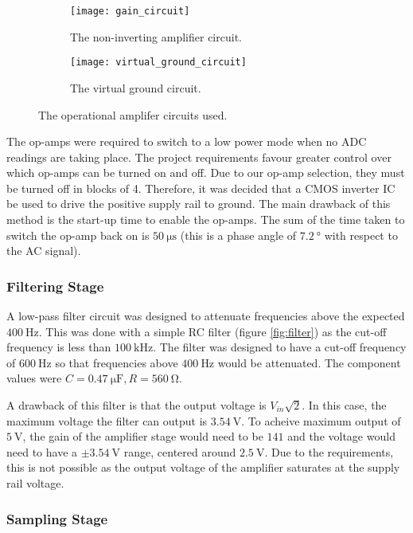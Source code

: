 \begin{figure}[ht]
\centering

\begin{subfigure}[c]{0.45\textwidth}
	\centering
	\texttt{[image: gain\_circuit]}
	\caption{The non-inverting amplifier circuit.}
	\label{fig:non-inverting-op-amp}
\end{subfigure}
\hfill
\begin{subfigure}[c]{0.45\textwidth}
	\centering
	\vfill
	\texttt{[image: virtual\_ground\_circuit]}
	\vfill
	\caption{The virtual ground circuit.}
	\label{fig:half-supply}
\end{subfigure}

\caption{The operational amplifer circuits used.}
\end{figure}

The op-amps were required to switch to a low power mode when no ADC readings are taking place.
The project requirements favour greater control over which op-amps can be turned on and off.
Due to our op-amp selection, they must be turned off in blocks of 4.
Therefore, it was decided that a CMOS inverter IC be used to drive the positive supply rail to ground.
The main drawback of this method is the start-up time to enable the op-amps.
The sum of the time taken to switch the op-amp back on is $\SI{50}{\micro\second}$ (this is a phase angle of $\SI{7.2}{\degree}$ with respect to the AC signal).

\subsubsection{Filtering Stage}

A low-pass filter circuit was designed to attenuate frequencies above the expected $\SI{400}{\hertz}$.
This was done with a simple RC filter (figure \ref{fig:filter}) as the cut-off frequency is less than $\SI{100}{\kilo\hertz}$.
The filter was designed to have a cut-off frequency of $\SI{600}{\hertz}$ so that frequencies above $\SI{400}{\hertz}$ would be attenuated.
The component values were $C = \SI{0.47}{\micro\farad}, R = \SI{560}{\ohm}$.

A drawback of this filter is that the output voltage is $V_{in} \sqrt{2}$.
In this case, the maximum voltage the filter can output is $\SI{3.54}{\volt}$.
To acheive maximum output of $\SI{5}{\volt}$, the gain of the amplifier stage would need to be $141$ and the voltage would need to have a $\pm\SI{3.54}{\volt}$ range, centered around $\SI{2.5}{\volt}$.
Due to the requirements, this is not possible as the output voltage of the amplifier saturates at the supply rail voltage.

\subsubsection{Sampling Stage}

